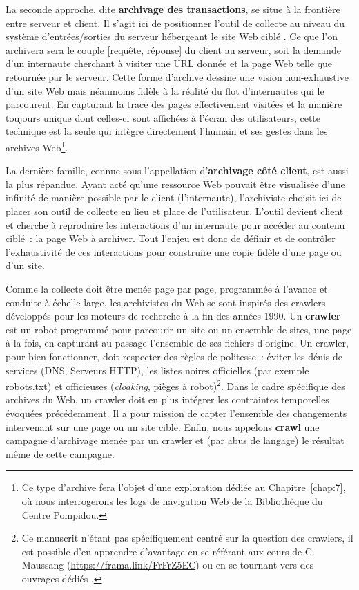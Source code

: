\documentclass[symmetric,justified,marginals=raggedouter]{tufte-book}
\begin{document}
La seconde approche, dite \textbf{archivage des transactions}, se situe à la frontière entre serveur et client. Il s'agit ici de positionner l'outil de collecte au niveau du système d'entrées/sorties du serveur hébergeant le site Web ciblé \citep{fitch_web_2003}. Ce que l'on archivera sera le couple [requête, réponse] du client au serveur, soit la demande d'un internaute cherchant à visiter une URL donnée et la page Web telle que retournée par le serveur. Cette forme d'archive dessine une vision non-exhaustive d'un site Web mais néanmoins fidèle à la réalité du flot d'internautes qui le parcourent. En capturant la trace des pages effectivement visitées et la manière toujours unique dont celles-ci sont affichées à l'écran des utilisateurs, cette technique est la seule qui intègre directement l'humain et ses gestes dans les archives Web\footnote{\RaggedOuter Ce type d'archive fera l'objet d'une exploration dédiée au Chapitre~\ref{chap:7}, où nous interrogerons les logs de navigation Web de la Bibliothèque du Centre Pompidou.}.  

La dernière famille, connue sous l'appellation d'\textbf{archivage côté client}, est aussi la plus répandue. Ayant acté qu'une ressource Web pouvait être visualisée d'une infinité de manière possible par le client (l'internaute), l'archiviste choisit ici de placer son outil de collecte en lieu et place de l'utilisateur. L'outil devient client et cherche à reproduire les interactions d'un internaute pour accéder au contenu ciblé~: la page Web à archiver. Tout l'enjeu est donc de définir et de contrôler l'exhaustivité de ces interactions pour construire une copie fidèle d'une page ou d'un site. 

Comme la collecte doit être menée page par page, programmée à l'avance et conduite à échelle large, les archivistes du Web se sont inspirés des crawlers développés pour les moteurs de recherche \citep{pant_crawling_2004} à la fin des années 1990. Un \textbf{crawler} est un robot programmé pour parcourir un site ou un ensemble de sites, une page à la fois, en capturant au passage l'ensemble de ses fichiers d'origine. Un crawler, pour bien fonctionner, doit respecter des règles de politesse~: éviter les dénis de services (DNS, Serveurs HTTP), les listes noires officielles (par exemple robots.txt) et officieuses (\textit{cloaking}, pièges à robot)\footnote{\RaggedOuter Ce manuscrit n'étant pas spécifiquement centré sur la question des crawlers, il est possible d'en apprendre d'avantage en se référant aux cours de C. Maussang (\url{https://frama.link/FrFrZ5EC}) ou en se tournant vers des ouvrages dédiés \citep{chakrabarti_mining_2002,mitchell_web_2015}.}. Dans le cadre spécifique des archives du Web, un crawler doit en plus intégrer les contraintes temporelles évoquées précédemment. Il a pour mission de capter l'ensemble des changements intervenant sur une page ou un site cible. Enfin, nous appelons \textbf{crawl} une campagne d'archivage menée par un crawler et (par abus de langage) le résultat même de cette campagne. 
\end{document}
